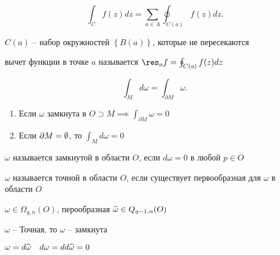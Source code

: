 \begin{theorem}

    \[
        \int_Cf(z)dz = \sum_{a\in A}\oint_{C(a)}f(z)dz  
    .\] 

    $C(a)$ -- набор окружностей  $\left\{ B(a) \right\} $, которые не пересекаются

    вычет функции в точке $a$ называется  $\res_a f = \oint _{C(a)}f(z)dz$
\end{theorem}


\begin{note}

    \[
        \int_Md\omega = \int_{\partial M}\omega
    .\] 
    \begin{enumerate}
        \item Если $\omega$ замкнута в $O\supset M \implies \int_{\partial M}\omega  =0$
        \item Если $\partial M = \emptyset $, то $\int_Md\omega = 0$
    \end{enumerate}
\end{note}

\begin{definition}
    $\omega$ называется замкнутой в области  $O$, если  $d\omega = 0$ в любой  $p\in O$
\end{definition}
\begin{definition}
    $\omega$ называется точной в области  $O$, если существует первообразная для  $\omega$  в области  $O$

    $\omega\in \Omega_{q,n}(O)$, перообразная  $\widetilde{\omega} \in Q_{q-1,n}(O)$
\end{definition}
\begin{note}
    $\omega$ -- Точная, то  $\omega$ -- замкнута

     $\omega = d\widetilde{\omega}\quad d\omega = dd\widetilde{\omega} = 0$
\end{note}

